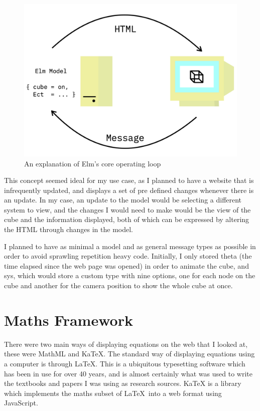\documentclass{l4proj}
\begin{document}
\begin{figure}[h!]
    \centering
    \includegraphics[width=0.8\linewidth]{dissertation/images/elm_loop.png}
    \caption{An explanation of Elm's core operating loop}
    \label{fig:enter-label}
\end{figure}

This concept seemed ideal for my use case, as I planned to have a website that is infrequently updated, and displays a set of pre defined changes whenever there is an update.  In my case, an update to the model would be selecting a different system to view, and the changes I would need to make would be the view of the cube and the information displayed, both of which can be expressed by altering the HTML through changes in the model.

I planned to have as minimal a model and as general message types as possible in order to avoid sprawling repetition heavy code.  Initially, I only stored theta (the time elapsed since the web page was opened) in order to animate the cube, and sys, which would store a custom type with nine options, one for each node on the cube and another for the camera position to show the whole cube at once.

\section{Maths Framework}

There were two main ways of displaying equations on the web that I looked at, these were MathML and KaTeX.  The standard way of displaying equations using a computer is through \LaTeX.  This is a ubiquitous typesetting software which has been in use for over 40 years, and is almost certainly what was used to write the textbooks and papers I was using as research sources.  KaTeX is a library which implements the maths subset of \LaTeX \ into a web format using JavaScript.
\end{document}
